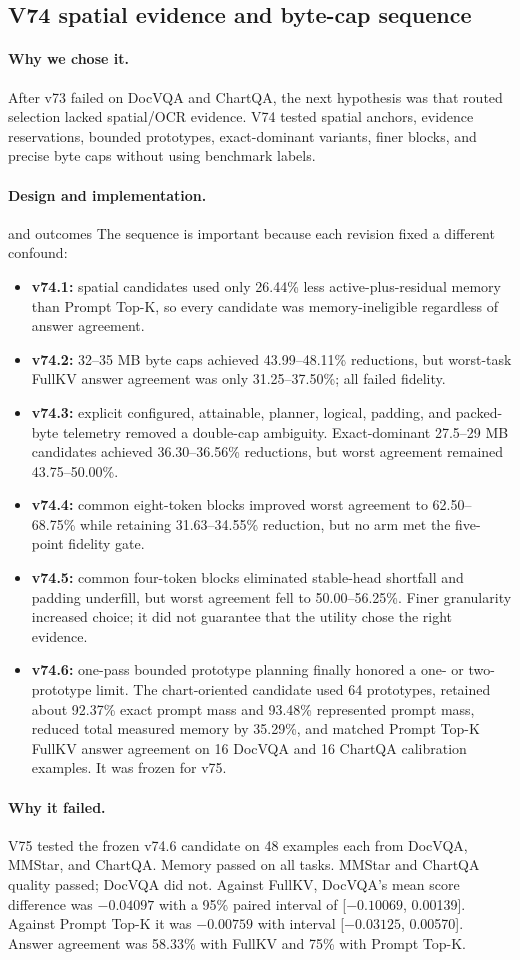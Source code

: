 \documentclass[11pt]{article}
\newcommand{\reason}{\paragraph{Why we chose it.}}
\newcommand{\design}{\paragraph{Design and implementation.}}
\newcommand{\failure}{\paragraph{Why it failed.}}
\begin{document}
\subsection{V74 spatial evidence and byte-cap sequence}

\reason
After v73 failed on DocVQA and ChartQA, the next hypothesis was that routed selection lacked
spatial/OCR evidence.  V74 tested spatial anchors, evidence reservations, bounded prototypes,
exact-dominant variants, finer blocks, and precise byte caps without using benchmark labels.

\design and outcomes
The sequence is important because each revision fixed a different confound:

\begin{itemize}
  \item \textbf{v74.1:} spatial candidates used only 26.44\% less active-plus-residual memory than
  Prompt Top-K, so every candidate was memory-ineligible regardless of answer agreement.
  \item \textbf{v74.2:} 32--35 MB byte caps achieved 43.99--48.11\% reductions, but worst-task
  FullKV answer agreement was only 31.25--37.50\%; all failed fidelity.
  \item \textbf{v74.3:} explicit configured, attainable, planner, logical, padding, and packed-byte
  telemetry removed a double-cap ambiguity.  Exact-dominant 27.5--29 MB candidates achieved
  36.30--36.56\% reductions, but worst agreement remained 43.75--50.00\%.
  \item \textbf{v74.4:} common eight-token blocks improved worst agreement to 62.50--68.75\% while
  retaining 31.63--34.55\% reduction, but no arm met the five-point fidelity gate.
  \item \textbf{v74.5:} common four-token blocks eliminated stable-head shortfall and padding
  underfill, but worst agreement fell to 50.00--56.25\%.  Finer granularity increased choice; it
  did not guarantee that the utility chose the right evidence.
  \item \textbf{v74.6:} one-pass bounded prototype planning finally honored a one- or two-prototype
  limit.  The chart-oriented candidate used 64 prototypes, retained about 92.37\% exact prompt
  mass and 93.48\% represented prompt mass, reduced total measured memory by 35.29\%, and matched
  Prompt Top-K FullKV answer agreement on 16 DocVQA and 16 ChartQA calibration examples.  It was
  frozen for v75.
\end{itemize}

\failure
V75 tested the frozen v74.6 candidate on 48 examples each from DocVQA, MMStar, and ChartQA.  Memory
passed on all tasks.  MMStar and ChartQA quality passed; DocVQA did not.  Against FullKV, DocVQA's
mean score difference was $-0.04097$ with a 95\% paired interval of
[$-0.10069$, 0.00139].  Against Prompt Top-K it was $-0.00759$ with interval
[$-0.03125$, 0.00570].  Answer agreement was 58.33\% with FullKV and 75\% with Prompt Top-K.
\end{document}
